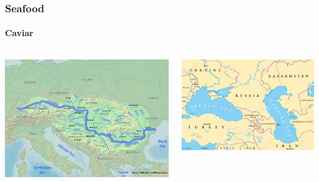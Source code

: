 \documentclass[10pt]{beamer}
\begin{document}
\begin{frame}
\frametitle{Seafood}
\framesubtitle{Caviar}

	\begin{columns}
		\begin{column}{0.5\textwidth}
			\begin{center}
				\includegraphics[width=1.0\textwidth]{figures/Danube.png}
			\end{center}
		\end{column}
		
		\begin{column}{0.5\textwidth}
			\begin{center}
				\includegraphics[width=1.0\textwidth]{figures/Caspain.jpg}
			\end{center}
		\end{column}
	\end{columns}
\end{frame}
\end{document}
